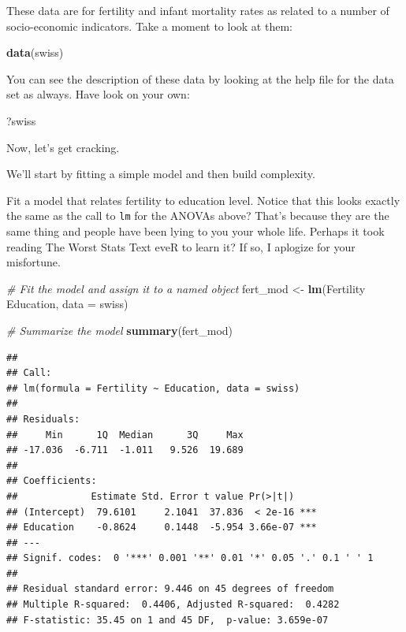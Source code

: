 \documentclass[
]{book}
\newenvironment{Shaded}{\begin{snugshade}}{\end{snugshade}}
\newcommand{\CommentTok}[1]{\textcolor[rgb]{0.56,0.35,0.01}{\textit{#1}}}
\newcommand{\DataTypeTok}[1]{\textcolor[rgb]{0.13,0.29,0.53}{#1}}
\newcommand{\KeywordTok}[1]{\textcolor[rgb]{0.13,0.29,0.53}{\textbf{#1}}}
\newcommand{\NormalTok}[1]{#1}
\newcommand{\OperatorTok}[1]{\textcolor[rgb]{0.81,0.36,0.00}{\textbf{#1}}}
\newcommand{\StringTok}[1]{\textcolor[rgb]{0.31,0.60,0.02}{#1}}
\begin{document}
These data are for fertility and infant mortality rates as related to a number of socio-economic indicators. Take a moment to look at them:

\begin{Shaded}
\begin{Highlighting}[]
\KeywordTok{data}\NormalTok{(swiss)}
\end{Highlighting}
\end{Shaded}

You can see the description of these data by looking at the help file for the data set as always. Have look on your own:

\begin{Shaded}
\begin{Highlighting}[]
\NormalTok{?swiss}
\end{Highlighting}
\end{Shaded}

Now, let's get cracking.

We'll start by fitting a simple model and then build complexity.

Fit a model that relates fertility to education level. Notice that this looks exactly the same as the call to \texttt{lm} for the ANOVAs above? That's because they are the same thing and people have been lying to you your whole life. Perhaps it took reading The Worst Stats Text eveR to learn it? If so, I aplogize for your misfortune.

\begin{Shaded}
\begin{Highlighting}[]
\CommentTok{# Fit the model and assign it to a named object}
\NormalTok{fert_mod <-}\StringTok{ }\KeywordTok{lm}\NormalTok{(Fertility }\OperatorTok{~}\StringTok{ }\NormalTok{Education, }\DataTypeTok{data =}\NormalTok{ swiss)}

\CommentTok{# Summarize the model}
\KeywordTok{summary}\NormalTok{(fert_mod)}
\end{Highlighting}
\end{Shaded}

\begin{verbatim}
## 
## Call:
## lm(formula = Fertility ~ Education, data = swiss)
## 
## Residuals:
##     Min      1Q  Median      3Q     Max 
## -17.036  -6.711  -1.011   9.526  19.689 
## 
## Coefficients:
##             Estimate Std. Error t value Pr(>|t|)    
## (Intercept)  79.6101     2.1041  37.836  < 2e-16 ***
## Education    -0.8624     0.1448  -5.954 3.66e-07 ***
## ---
## Signif. codes:  0 '***' 0.001 '**' 0.01 '*' 0.05 '.' 0.1 ' ' 1
## 
## Residual standard error: 9.446 on 45 degrees of freedom
## Multiple R-squared:  0.4406,	Adjusted R-squared:  0.4282 
## F-statistic: 35.45 on 1 and 45 DF,  p-value: 3.659e-07
\end{verbatim}
\end{document}
